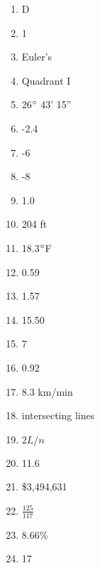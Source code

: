 \documentclass[../uilmath.tex]{subfiles}
\begin{document}
\begin{enumerate}[label=\bfseries\arabic*.]
    \item %
    D 

    \item %
    1 

    \item %
    Euler's 

    \item %
    Quadrant I 

    \item %
    26$\degree$ 43' 15''

    \item %
    -2.4

    \item %
    -6

    \item %
    -8

    \item %
    1.0

    \item %
    204 ft

    \item %
    18.3$\degree$F 

    \item %
    0.59

    \item %
    1.57

    \item %
    15.50

    \item %
    7

    \item %
    0.92

    \item %
    8.3 km/min 

    \item %
    intersecting lines 

    \item %
    $2L/n$

    \item %
    11.6

    \item %
    \$3,494,631

    \item %
    $\frac{125}{117}$

    \item %
    8.66\% 

    \item %
    17


\end{enumerate}
\end{document}
